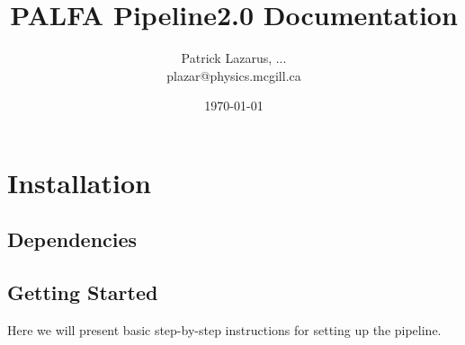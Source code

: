


\title{PALFA Pipeline2.0 Documentation}
\author{Patrick Lazarus, ... \\
        plazar@physics.mcgill.ca}
\date{\today}

\maketitle

\begin{abstract}
\end{abstract}

\section{Installation}
\subsection{Dependencies}

\subsection{Getting Started}
Here we will present basic step-by-step instructions for setting up the pipeline.

